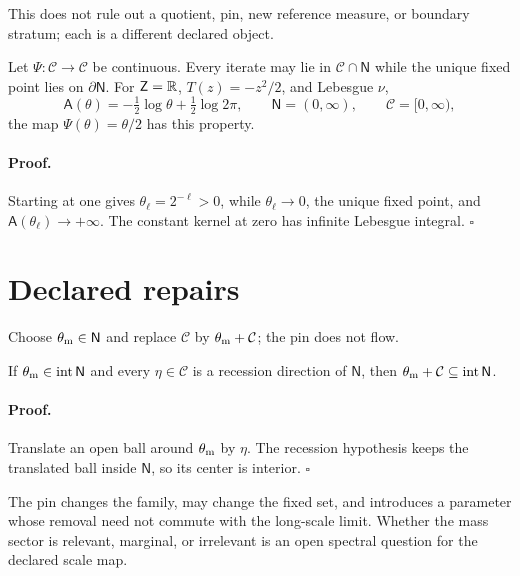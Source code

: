 This does not rule out a quotient, pin, new reference measure, or boundary
stratum; each is a different declared object. 

Let \(\Psi:\mathcal C\to\mathcal C\) be continuous. Every iterate may lie in
\(\mathcal C\cap\mathsf N\) while the unique fixed point lies on
\(\partial\mathsf N\). For
\(\mathsf Z=\mathbb R\), \(T(z)=-z^2/2\), and Lebesgue \(\nu\),
\begin{equation}
\mathsf A(\theta)=-\tfrac12\log\theta+\tfrac12\log2\pi,
\qquad
\mathsf N=(0,\infty),
\qquad
\mathcal C=[0,\infty),
\label{eq:exp-scale-witness}
\end{equation}
the map \(\Psi(\theta)=\theta/2\) has this property.

\paragraph{Proof.}
Starting at one gives \(\theta_\ell=2^{-\ell}>0\), while
\(\theta_\ell\to0\), the unique fixed point, and
\(\mathsf A(\theta_\ell)\to+\infty\). The constant kernel at zero has
infinite Lebesgue integral. \(\square\)

\section{Declared repairs}
\label{sec:exp-repairs}

Choose \(\theta_{\rm m}\in\mathsf N\) and replace
\(\mathcal C\) by \(\theta_{\rm m}+\mathcal C\); the pin does not flow.

If \(\theta_{\rm m}\in\operatorname{int}\mathsf N\) and every
\(\eta\in\mathcal C\) is a recession direction of \(\mathsf N\), then
\(\theta_{\rm m}+\mathcal C\subseteq\operatorname{int}\mathsf N\).

\paragraph{Proof.}
Translate an open ball around \(\theta_{\rm m}\) by \(\eta\). The recession
hypothesis keeps the translated ball inside \(\mathsf N\), so its center is
interior. \(\square\)

The pin changes the family, may change the fixed set, and introduces a
parameter whose removal need not commute with the long-scale limit. Whether
the mass sector is relevant, marginal, or irrelevant is an open spectral
question for the declared scale map. 

